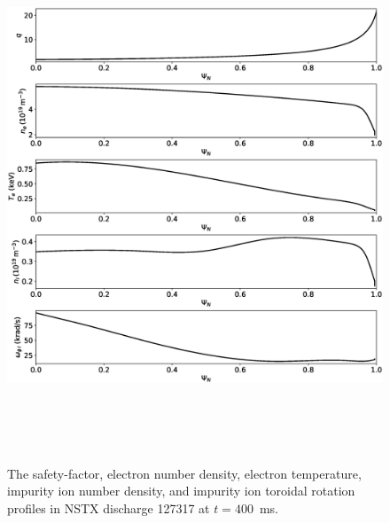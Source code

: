 \documentclass[12pt,prb,aps]{revtex4-1}
\begin{document}
\begin{figure}
\centerline{\includegraphics[height=6.25in]{Fig1.eps}}
\caption{The safety-factor, electron number density, electron temperature, impurity ion number density, and  impurity ion toroidal rotation profiles in NSTX discharge 127317 at $t=400$\, ms.}\label{fig1}
\end{figure}
\end{document}
